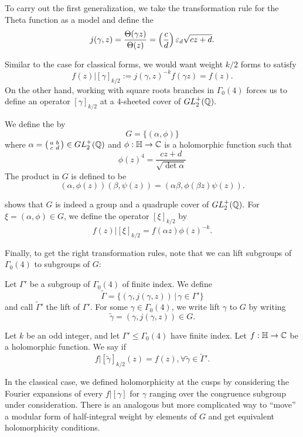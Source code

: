 \documentclass[12pt, a4paper]{amsart}
\begin{document}
To carry out the first generalization, we take the transformation rule for the
Theta function as a model and define the 
\[j(\gamma, z) = \frac{\Theta(\gamma z)}{\Theta(z)} =
  \left(\frac{c}{d}\right) \varepsilon_d \sqrt{cz + d}.\]

Similar to the case for classical forms, we would want weight $k/2$ forms to
satisfy
\[f(z)|[\gamma]_{k/2} := j(\gamma,z)^{-k}f(\gamma z) = f(z).\]
On the other hand, working with square roots branches in $\Gamma_0(4)$ forces us to
define an operator $[\gamma]_{k/2}$ at a 4-sheeted cover of $GL_2^+({\mathbb Q}).$

\begin{defn}
  We define the  by
  \[G = \{(\alpha, \phi )\}\]
  where $\alpha = \left(
    \begin{smallmatrix}
      a & b \\ c & d
    \end{smallmatrix}
\right) \in GL_2^+({\mathbb Q})$ and $\phi : \mathbb{H} \rightarrow {\mathbb C}$ is a holomorphic function such
that
\[\phi(z)^4 = \frac{cz+d}{\sqrt{\det \alpha}}\]
The product in $G$ is defined to be
\[(\alpha, \phi(z))(\beta, \psi(z)) = (\alpha \beta, \phi(\beta z) \psi(z)).\]
\end{defn}
\cite[Pages 179-180]{koblitz} shows that $G$ is indeed a group and a quadruple cover of 
$GL_2^+({\mathbb Q}).$
For $\xi = (\alpha, \phi) \in G$, we define the operator $[\xi]_{k/2}$ by
\[f(z) | [\xi]_{k/2} = f(\alpha z)\phi(z)^{-k}.\]

Finally, to get the right transformation rules, note that we can lift subgroups
of $\Gamma_0(4)$ to
subgroups of $G$:

Let $\Gamma'$ be a subgroup of $\Gamma_0(4)$ of finite index. We define
\[\tilde{\Gamma} = \{(\gamma, j(\gamma,z)) \, | \, \gamma \in \Gamma'\}\]
and call $\tilde{\Gamma}'$ the lift of $\Gamma'$. For some $\gamma \in
\Gamma_0(4)$, we write lift $\gamma$ to $G$ by writing
\[\tilde{\gamma} = (\gamma, j(\gamma,z)) \in G.\]

\begin{defn}
  Let $k$ be an odd integer, and let $\Gamma' \leq \Gamma_0(4)$ have finite index.
  Let $f : \mathbb{H} \rightarrow {\mathbb C}$ be a holomorphic function. We say  if
  \[f | [\tilde{\gamma}]_{k/2} (z) = f(z), \forall \tilde{\gamma} \in
    \tilde{\Gamma}'.\]
\end{defn}

In the classical case, we defined holomorphicity at the cusps by considering
the Fourier expansions of every $f | [\gamma]$ for $\gamma$ ranging over the
congruence subgroup under consideration. There is an analogous but more
complicated way to ``move'' a modular form of half-integral weight by elements
of $G$ and get equivalent holomorphicity conditions.
\end{document}
